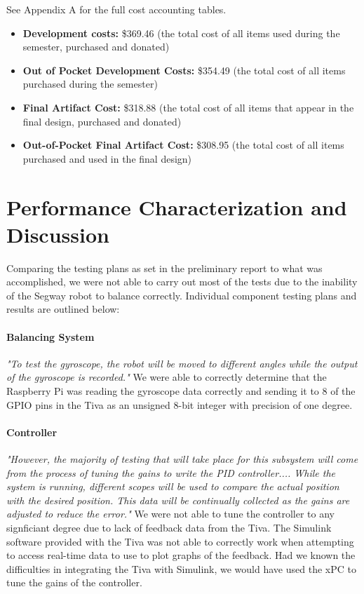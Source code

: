 \documentclass[11pt]{report}
\begin{document}
\begin{spacing}{1.5}
See Appendix A for the full cost accounting tables.

\begin{itemize}[noitemsep,nolistsep]
    \item \textbf{Development costs:} \$369.46 (the total cost of all items used during the semester, purchased and donated)
    \item \textbf{Out of Pocket Development Costs:} \$354.49 (the total cost of all items purchased during the semester)
    \item \textbf{Final Artifact Cost:} \$318.88 (the total cost of all items that appear in the final design, purchased and donated)
    \item \textbf{Out-of-Pocket Final Artifact Cost:} \$308.95 (the total cost of all items purchased and used in the final design)

\end{itemize}

\section*{Performance Characterization and Discussion}

    Comparing the testing plans as set in the preliminary report to what was accomplished, we were not able to carry out most of the tests due to the inability of the Segway robot to balance correctly. Individual component testing plans and results are outlined below:
    
        \paragraph{Balancing System} \emph{"To test the gyroscope, the robot will be moved to different angles while the output of the gyroscope is recorded."} We were able to correctly determine that the Raspberry Pi was reading the gyroscope data correctly and sending it to 8 of the GPIO pins in the Tiva as an unsigned 8-bit integer with precision of one degree.
        
        \paragraph{Controller} \emph{"However, the majority of testing that will take place for this subsystem will come from the process of tuning the gains to write the PID controller.... While the system is running, different scopes will be used to compare the actual position with the desired position.  This data will be continually collected as the gains are adjusted to reduce the error."} We were not able to tune the controller to any signficiant degree due to lack of feedback data from the Tiva. The Simulink software provided with the Tiva was not able to correctly work when attempting to access real-time data to use to plot graphs of the feedback. Had we known the difficulties in integrating the Tiva with Simulink, we would have used the xPC to tune the gains of the controller.
        

\end{spacing}
\end{document}
